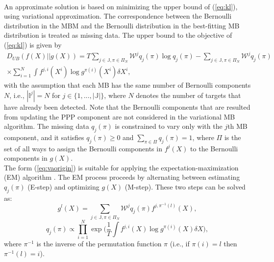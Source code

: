 ~\\
An approximate solution is based on minimizing the upper bound of (\ref{eq:kl}), using variational approximation. The correspondence between the Bernoulli distribution in the MBM and the Bernoulli distribution in the best-fitting MB distribution is treated as missing data. The upper bound to the objective of (\ref{eq:kl}) is given by \cite{variational}
\begin{multline}
D_{UB}(f(X)||g(X))= T\sum_{j\in\mathbb{J},\pi\in\Pi_N}\mathcal{W}^jq_j(\pi)\log q_j(\pi)-\sum_{j\in\mathbb{J},\pi\in\Pi_N}\mathcal{W}^jq_j(\pi)\\
\times\sum_{i=1}^N\int f^{j,i}(X^i)\log g^{\pi(i)}(X^i)\delta X^i,
\label{eq:vaorigin}
\end{multline}
with the assumption that each MB has the same number of Bernoulli components  $N$, i.e., $|\mathbb{I}^j|=N$ for $j\in\{1,...,|\mathbb{J}|\}$, where $N$ denotes the number of targets that have already been detected. Note that the Bernoulli components that are resulted from updating the PPP component are not considered in the variational MB algorithm. The missing data $q_j(\pi)$ is constrained to vary only with the $j$th MB component, and it satisfies $q_j(\pi) \geq 0$ and $\sum_{\pi\in\Pi}q_j(\pi)=1$, where $\Pi$ is the set of all ways to assign the Bernoulli components in $f^j(X)$ to the Bernoulli components in $g(X)$. 
~\\

The form (\ref{eq:vaorigin}) is suitable for applying the expectation-maximization (EM) algorithm \cite{variational}. The EM process proceeds by alternating between estimating $q_j(\pi)$ (E-step) and optimizing $g(X)$ (M-step). These two steps can be solved as:
\begin{equation}
    g^{l}(X) = \sum_{j\in\mathbb{J},\pi\in\Pi_N}\mathcal{W}^jq_j(\pi)f^{j,\pi^{-1}(l)}(X),
    \label{eq:mstep}
\end{equation}
\begin{equation}
    q_j(\pi)\propto \prod^N_{i=1}\exp\bigg(\frac{
    1}{T}\int f^{j,i}(X)\log g^{\pi(i)}(X)\delta X\bigg),
    \label{eq:estep}
\end{equation}
where $\pi^{-1}$ is the inverse of the permutation function $\pi$ (i.e., if $\pi(i)=l$ then $\pi^{-1}(l)=i$).


